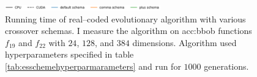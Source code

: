 \begin{figure}[ht!]
    \begin{minipage}{\textwidth}
        \centering
        \includegraphics[width=0.6\textwidth]{img/runs/time_es_schema_legend.pdf}
    \end{minipage}

    \caption[Running time of crossover schemas]{Running time of real--coded evolutionary algorithm with various crossover schemas. I measure the algorithm on \acrshort{acc:bbob} functions $f_{19}$ and $f_{22}$ with $24$, $128$, and $384$ dimensions. Algorithm used hyperparameters specified in table \ref{tab:esschemehyperparmarameters} and run for $1000$ generations.}
    \label{meas:schema}
\end{figure}





